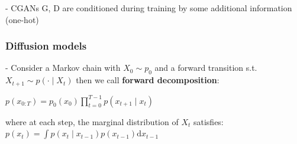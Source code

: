 

- CGANs G, D are conditioned during training by some additional information (one-hot)







\subsubsection*{Diffusion models}





- Consider a Markov chain with $X_{0} \sim p_{0}$ and a forward transition s.t. $X_{t+1} \sim p(\cdot \mid X_{t})$ then we call \textbf{forward decomposition}:

$
p(x_{0: T})=p_{0}(x_{0}) \prod_{t=0}^{T-1} p(x_{t+1} \mid x_{t})
$

where at each step, the marginal distribution of $X_{t}$ satisfies:
$
p(x_{t})=\int p(x_{t} \mid x_{t-1}) p(x_{t-1}) \mathrm{d} x_{t-1}
$


